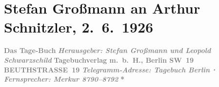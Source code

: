 

         
         \renewcommand{\erwaehntePersonen}{Personen: Stefan Großmann, Carl Ossietzky, Leopold Schwarzschild}
         \renewcommand{\erwaehnteInstitutionen}{Institutionen: Das Tage-Buch}
         \renewcommand{\erwaehnteOrte}{Orte: Berlin, Beuthstrasse, Sternwartestraße 71, Wien, XVIII., Währing}
         \renewcommand{\erwaehnteWerke}{Werke: Bemerkungen [Korrektur], Buch der Sprüche und Bedenken}
               \section[Stefan Großmann an Arthur Schnitzler, 2. 6. 1926]{ Stefan Großmann an Arthur Schnitzler, 2. 6. 1926}\nopagebreak{}\rehead{ }\begin{ledgroupsized}[t]{13cm}\normalsize\beginnumbering{} \toendnotes[C]{\smallbreak\pagebreak[2]} 
\toendnotes[C]{\smallbreak}\pstart
           \noindent{}\centering{}{\pb}\textcolor{gray}{\textbf{Das Tage-Buch}}\pend
           \pstart
           \noindent{}\centering{}\textcolor{gray}{\textbf{\emph{Herausgeber: Stefan Großmann und Leopold Schwarzschild}}}\pend
           \pstart
           \noindent{}\centering{}\textcolor{gray}{\textbf{Tagebuchverlag m. b. H., Berlin SW 19}}\pend
           \pstart
           \noindent{}\centering{}\textcolor{gray}{\textbf{BEUTHSTRASSE 19}}\pend
           \pstart
           \noindent{}\centering{}\textcolor{gray}{\textbf{\emph{Telegramm-Adresse: Tagebuch Berlin ⋅ Fernsprecher: Merkur 8790–8792}}}\pend
           \pstart
           \noindent{}\centering{}\textcolor{gray}{\textbf{\emph{}}}\pend
           \pstart
           \noindent{}\centering{}\textcolor{gray}{\textbf{*}}\pend

\end{ledgroupsized}
